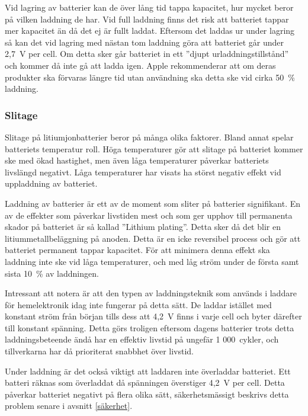 \documentclass[a4paper,12pt]{article}
\begin{document}
Vid lagring av batterier kan de över lång tid tappa kapacitet, hur mycket beror på vilken laddning de har. Vid full laddning finns det risk att batteriet tappar mer kapacitet än då det ej är fullt laddat. Eftersom det laddas ur under lagring så kan det vid lagring med nästan tom laddning göra att batteriet går under 2,7~V per cell. Om detta sker går batteriet in ett ''djupt urladdningstillstånd'' och kommer då inte gå att ladda igen. Apple rekommenderar att om deras produkter ska förvaras längre tid utan användning ska detta ske vid cirka 50~\% laddning. \cite{apple}

\subsubsection{Slitage}
\label{slitage}
Slitage på litiumjonbatterier beror på många olika faktorer. Bland annat spelar batteriets temperatur roll. Höga temperaturer gör att slitage på batteriet kommer ske med ökad hastighet, men även låga temperaturer påverkar batteriets livslängd negativt. Låga temperaturer har visats ha störst negativ effekt vid uppladdning av batteriet. \cite{ageing}

Laddning av batterier är ett av de moment som sliter på batterier signifikant. En av de effekter som påverkar livstiden mest \cite{charging} och som ger upphov till permanenta skador på batteriet är så kallad ''Lithium plating''. Detta sker då det blir en litiummetallbeläggning på anoden.\cite{nasa} Detta är en icke reversibel process och gör att batteriet permanent tappar kapacitet. För att minimera denna effekt ska laddning inte ske vid låga temperaturer, och med låg ström under de första samt sista 10~\% av laddningen. \cite{charging-p}

Intressant att notera är att den typen av laddningsteknik som används i laddare för hemelektronik idag inte fungerar på detta sätt.\cite{apple} De laddar istället med konstant ström från början tills dess att 4,2~V finns i varje cell och byter därefter till konstant spänning. Detta görs troligen eftersom dagens batterier trots detta laddningsbeteende ändå har en effektiv livstid på ungefär 1 000~cykler, och tillverkarna har då prioriterat snabbhet över livstid.

Under laddning är det också viktigt att laddaren inte överladdar batteriet. Ett batteri räknas som överladdat då spänningen överstiger 4,2~V per cell. Detta påverkar batteriet negativt på flera olika sätt, säkerhetsmässigt beskrivs detta problem senare i avsnitt \ref{säkerhet}.
\end{document}
